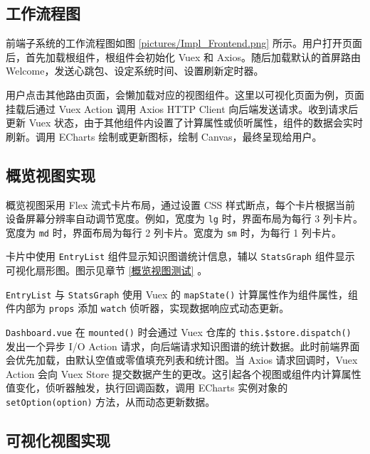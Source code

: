 \documentclass[a4paper,AutoFakeBold,oneside,12pt]{book}
\begin{document}
\subsection{工作流程图}


前端子系统的工作流程图如图 \ref{pictures/Impl_Frontend.png} 所示。用户打开页面后，首先加载根组件，根组件会初始化 Vuex 和 Axios。随后加载默认的首屏路由 Welcome，发送心跳包、设定系统时间、设置刷新定时器。

用户点击其他路由页面，会懒加载对应的视图组件。这里以可视化页面为例，页面挂载后通过 Vuex Action 调用 Axios HTTP Client 向后端发送请求。收到请求后更新 Vuex 状态，由于其他组件内设置了计算属性或侦听属性，组件的数据会实时刷新。调用 ECharts 绘制或更新图标，绘制 Canvas，最终呈现给用户。

\subsection{概览视图实现\label{概览视图实现}}

概览视图采用 Flex 流式卡片布局，通过设置 CSS 样式断点，每个卡片根据当前设备屏幕分辨率自动调节宽度。例如，宽度为 \lstinline|lg| 时，界面布局为每行 3 列卡片。宽度为 \lstinline|md| 时，界面布局为每行 2 列卡片。宽度为 \lstinline|sm| 时，为每行 1 列卡片。

卡片中使用 \lstinline|EntryList| 组件显示知识图谱统计信息，辅以 \lstinline|StatsGraph| 组件显示可视化扇形图。图示见章节 \ref{概览视图测试} 。

\lstinline|EntryList| 与 \lstinline|StatsGraph| 使用 Vuex 的 \lstinline|mapState()| 计算属性作为组件属性，组件内部为 \lstinline|props| 添加 \lstinline|watch| 侦听器，实现数据响应式动态更新。

\lstinline|Dashboard.vue| 在 \lstinline|mounted()| 时会通过 Vuex 仓库的 \lstinline|this.$store.dispatch()| 发出一个异步 I/O Action 请求，向后端请求知识图谱的统计数据。此时前端界面会优先加载，由默认空值或零值填充列表和统计图。当 Axios 请求回调时，Vuex Action 会向 Vuex Store 提交数据产生的更改。这引起各个视图或组件内计算属性值变化，侦听器触发，执行回调函数，调用 ECharts 实例对象的 \lstinline|setOption(option)| 方法，从而动态更新数据。

\subsection{可视化视图实现\label{可视化视图实现}}
\end{document}
